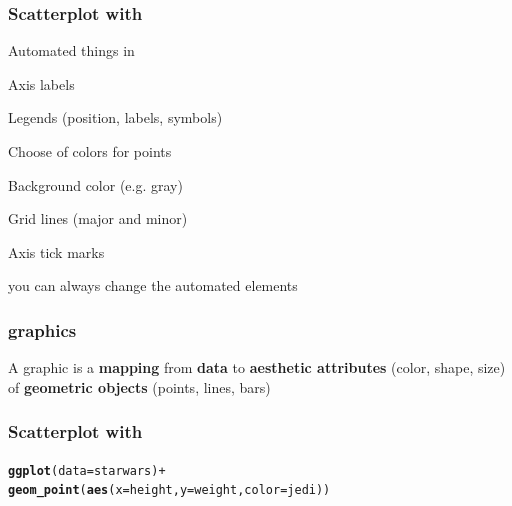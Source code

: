 \documentclass[12pt]{beamer}\usepackage[]{graphicx}\usepackage[]{color}
\makeatletter
\newcommand{\hlopt}[1]{\textcolor[rgb]{0,0,0}{#1}}%
\newcommand{\hlstd}[1]{\textcolor[rgb]{0.345,0.345,0.345}{#1}}%
\newcommand{\hlkwc}[1]{\textcolor[rgb]{0.333,0.667,0.333}{#1}}%
\newcommand{\hlkwd}[1]{\textcolor[rgb]{0.737,0.353,0.396}{\textbf{#1}}}%
\newenvironment{kframe}{%
 \def\at@end@of@kframe{}%
 \ifinner\ifhmode%
  \def\at@end@of@kframe{\end{minipage}}%
  \begin{minipage}{\columnwidth}%
 \fi\fi%
 \def\FrameCommand##1{\hskip\@totalleftmargin \hskip-\fboxsep
 \colorbox{shadecolor}{##1}\hskip-\fboxsep
     \hskip-\linewidth \hskip-\@totalleftmargin \hskip\columnwidth}%
 \MakeFramed {\advance\hsize-\width
   \@totalleftmargin\z@ \linewidth\hsize
   \@setminipage}}%
 {\par\unskip\endMakeFramed%
 \at@end@of@kframe}
\newenvironment{knitrout}{}{} %
\makeatother
\begin{document}

\begin{frame}[fragile]
\frametitle{Scatterplot with }

Automated things in 
\bi
  \item Axis labels
  \item Legends (position, labels, symbols)
  \item Choose of colors for points
  \item Background color (e.g. gray)
  \item Grid lines (major and minor)
  \item Axis tick marks
\ei

{\lit \small you can always change the automated elements}

\end{frame}


\begin{frame}
\frametitle{ graphics}

A graphic is a {\hilit \textbf{mapping}} from \textbf{data} to \textbf{aesthetic attributes} (color, shape, size) of \textbf{geometric objects} (points, lines, bars)
\eb

\end{frame}


\begin{frame}[fragile]
\frametitle{Scatterplot with }
\begin{knitrout}\scriptsize
{}\color{fgcolor}\begin{kframe}
\begin{alltt}
\hlkwd{ggplot}\hlstd{(}\hlkwc{data} \hlstd{= starwars)} \hlopt{+}
  \hlkwd{geom_point}\hlstd{(}\hlkwd{aes}\hlstd{(}\hlkwc{x} \hlstd{= height,} \hlkwc{y} \hlstd{= weight,} \hlkwc{color} \hlstd{= jedi))}
\end{alltt}


{\ttfamily\noindent\bfseries\color{errorcolor}{\#\# Error in ggplot(data = starwars): object 'starwars' not found}}\end{kframe}
\end{knitrout}
\end{frame}

\end{document}

